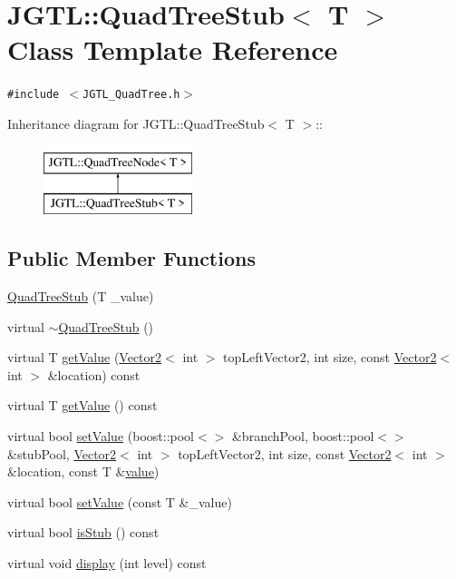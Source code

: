 \hypertarget{class_j_g_t_l_1_1_quad_tree_stub}{
\section{JGTL::Quad\-Tree\-Stub$<$ T $>$ Class Template Reference}
\label{class_j_g_t_l_1_1_quad_tree_stub}
}
{\tt \#include $<$JGTL\_\-Quad\-Tree.h$>$}

Inheritance diagram for JGTL::Quad\-Tree\-Stub$<$ T $>$::\begin{figure}[H]
\begin{center}
\leavevmode
\includegraphics[height=2cm]{class_j_g_t_l_1_1_quad_tree_stub}
\end{center}
\end{figure}
\subsection*{Public Member Functions}
\begin{CompactItemize}
\item 
\hyperlink{class_j_g_t_l_1_1_quad_tree_stub_f93b1d865168c08ccfc5f9ceebaa8003}{Quad\-Tree\-Stub} (T \_\-value)
\item 
virtual \hyperlink{class_j_g_t_l_1_1_quad_tree_stub_6106651b6f6f285ad1bb469f823ef8ad}{$\sim$Quad\-Tree\-Stub} ()
\item 
virtual T \hyperlink{class_j_g_t_l_1_1_quad_tree_stub_99e89a45f21e503a1cef13f54a8ef65b}{get\-Value} (\hyperlink{class_j_g_t_l_1_1_vector2}{Vector2}$<$ int $>$ top\-Left\-Vector2, int size, const \hyperlink{class_j_g_t_l_1_1_vector2}{Vector2}$<$ int $>$ \&location) const 
\item 
virtual T \hyperlink{class_j_g_t_l_1_1_quad_tree_stub_48f2d4a15b1b8b850b9d446fe972f561}{get\-Value} () const
\item 
virtual bool \hyperlink{class_j_g_t_l_1_1_quad_tree_stub_a89e27cf98e753df813770d7007b7a9b}{set\-Value} (boost::pool$<$$>$ \&branch\-Pool, boost::pool$<$$>$ \&stub\-Pool, \hyperlink{class_j_g_t_l_1_1_vector2}{Vector2}$<$ int $>$ top\-Left\-Vector2, int size, const \hyperlink{class_j_g_t_l_1_1_vector2}{Vector2}$<$ int $>$ \&location, const T \&\hyperlink{class_j_g_t_l_1_1_quad_tree_stub_2b4f08acca095e6e2f3f92afc9f0449e}{value})
\item 
virtual bool \hyperlink{class_j_g_t_l_1_1_quad_tree_stub_8f3a3fc28ed6b8880b68ad791c1cb931}{set\-Value} (const T \&\_\-value)
\item 
virtual bool \hyperlink{class_j_g_t_l_1_1_quad_tree_stub_69d364f4525bbc32d27ad2a7a2a4502b}{is\-Stub} () const
\item 
virtual void \hyperlink{class_j_g_t_l_1_1_quad_tree_stub_d9cc4e6b8fb18dd55043edf3f503c9c7}{display} (int level) const
\end{CompactItemize}
